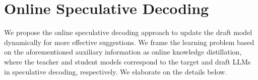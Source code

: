 
\section{Online Speculative Decoding}
\label{sec:methodology}
We propose the online speculative decoding approach to update the draft model dynamically for more effective suggestions. 
We frame the learning problem based on the aforementioned auxiliary information as online knowledge distillation, where the teacher and student models correspond to the target and draft LLMs in speculative decoding, respectively. 
We elaborate on the details below. 


